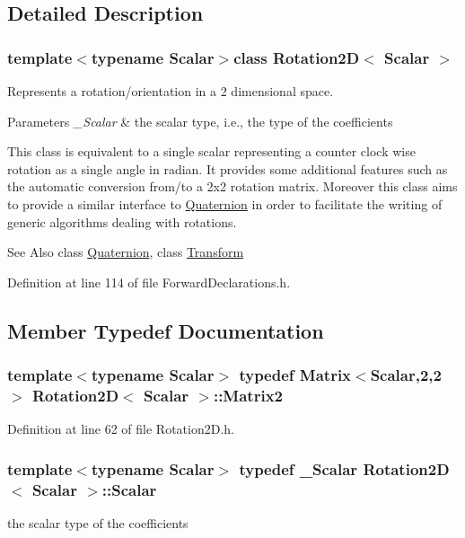 \subsection{Detailed Description}
\subsubsection*{template$<$typename Scalar$>$class Rotation2\-D$<$ Scalar $>$}

Represents a rotation/orientation in a 2 dimensional space. 


\begin{DoxyParams}{Parameters}
{\em \-\_\-\-Scalar} & the scalar type, i.\-e., the type of the coefficients\\
\hline
\end{DoxyParams}
This class is equivalent to a single scalar representing a counter clock wise rotation as a single angle in radian. It provides some additional features such as the automatic conversion from/to a 2x2 rotation matrix. Moreover this class aims to provide a similar interface to \hyperlink{class_quaternion}{Quaternion} in order to facilitate the writing of generic algorithms dealing with rotations.

\begin{DoxySeeAlso}{See Also}
class \hyperlink{class_quaternion}{Quaternion}, class \hyperlink{class_transform}{Transform} 
\end{DoxySeeAlso}


Definition at line 114 of file Forward\-Declarations.\-h.



\subsection{Member Typedef Documentation}
\hypertarget{class_rotation2_d_a1a1acef614c61a56878f65e6b58f4a77}{
\subsubsection[{Matrix2}]{\setlength{\rightskip}{0pt plus 5cm}template$<$typename Scalar$>$ typedef {\bf Matrix}$<${\bf Scalar},2,2$>$ {\bf Rotation2\-D}$<$ {\bf Scalar} $>$\-::{\bf Matrix2}}}\label{class_rotation2_d_a1a1acef614c61a56878f65e6b58f4a77}


Definition at line 62 of file Rotation2\-D.\-h.

\hypertarget{class_rotation2_d_a9fe0daf4c508069bf7c4b5705f89dc0c}{
\subsubsection[{Scalar}]{\setlength{\rightskip}{0pt plus 5cm}template$<$typename Scalar$>$ typedef \-\_\-\-Scalar {\bf Rotation2\-D}$<$ {\bf Scalar} $>$\-::{\bf Scalar}}}\label{class_rotation2_d_a9fe0daf4c508069bf7c4b5705f89dc0c}
the scalar type of the coefficients 

